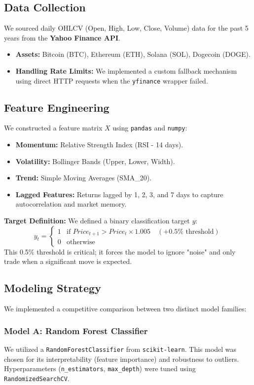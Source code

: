\documentclass[11pt,a4paper]{article}
\begin{document}
\subsection{Data Collection}
We sourced daily OHLCV (Open, High, Low, Close, Volume) data for the past 5 years from the \textbf{Yahoo Finance API}.
\begin{itemize}
    \item \textbf{Assets:} Bitcoin (BTC), Ethereum (ETH), Solana (SOL), Dogecoin (DOGE).
    \item \textbf{Handling Rate Limits:} We implemented a custom fallback mechanism using direct HTTP requests when the \texttt{yfinance} wrapper failed.
\end{itemize}

\subsection{Feature Engineering}
We constructed a feature matrix $X$ using \texttt{pandas} and \texttt{numpy}:
\begin{itemize}
    \item \textbf{Momentum:} Relative Strength Index (RSI - 14 days).
    \item \textbf{Volatility:} Bollinger Bands (Upper, Lower, Width).
    \item \textbf{Trend:} Simple Moving Averages (SMA\_20).
    \item \textbf{Lagged Features:} Returns lagged by 1, 2, 3, and 7 days to capture autocorrelation and market memory.
\end{itemize}

\textbf{Target Definition:} We defined a binary classification target $y$:
\[
y_t = 
\begin{cases} 
1 & \text{if } Price_{t+1} > Price_t \times 1.005 \quad (+0.5\% \text{ threshold}) \\
0 & \text{otherwise}
\end{cases}
\]
This 0.5\% threshold is critical; it forces the model to ignore "noise" and only trade when a significant move is expected.

\subsection{Modeling Strategy}
We implemented a competitive comparison between two distinct model families:

\subsubsection{Model A: Random Forest Classifier}
We utilized a \texttt{RandomForestClassifier} from \texttt{scikit-learn}. This model was chosen for its interpretability (feature importance) and robustness to outliers. Hyperparameters (\texttt{n\_estimators}, \texttt{max\_depth}) were tuned using \texttt{RandomizedSearchCV}.
\end{document}
